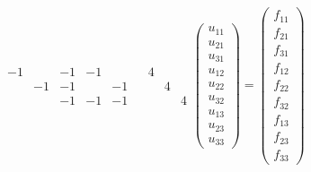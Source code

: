 \documentclass{exercise}
\begin{document}
\begin{itemize}
\[{\begin{array}{ccccc|cccc}
                -1 & & -1 & -1 & & & 4 & &\\
                & -1 & -1 & & -1 & & & 4 &\\
                & & -1 & -1 & -1 & & & & 4
            \end{array}}\begin{pmatrix}
                u_{11}\\u_{21}\\u_{31}\\u_{12}\\u_{22}\\u_{32}\\u_{13}\\u_{23}\\u_{33}
            \end{pmatrix} = \begin{pmatrix}
                f_{11}\\f_{21}\\f_{31}\\f_{12}\\f_{22}\\f_{32}\\f_{13}\\f_{23}\\f_{33}
            \end{pmatrix}
        \]
    \end{itemize}
\end{document}

